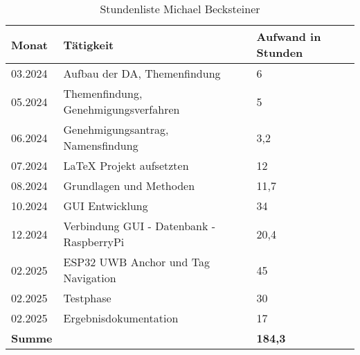 \begin{table}[h]
	\begin{tabular}{p{2.5cm} p{10.5cm} p{2.5cm}}
		\hline
		\textbf{Monat} & \textbf{Tätigkeit} & \textbf{Aufwand in Stunden} \\
		\hline
		03.2024 & Aufbau der DA, Themenfindung & 6 \\
		05.2024 & Themenfindung, Genehmigungsverfahren & 5 \\
		06.2024 & Genehmigungsantrag, Namensfindung & 3,2 \\
		07.2024 & LaTeX Projekt aufsetzten& 12 \\
		08.2024 & Grundlagen und Methoden & 11,7 \\
		10.2024 & GUI Entwicklung & 34 \\
		12.2024 & Verbindung GUI - Datenbank - RaspberryPi & 20,4 \\
		02.2025 & ESP32 UWB Anchor und Tag Navigation & 45 \\
		02.2025 & Testphase & 30 \\
		02.2025 &Ergebnisdokumentation & 17 \\
		
		\hline
		\textbf{Summe} & & \textbf{184,3} \\
		\hline
	\end{tabular}
	\caption{Stundenliste Michael Becksteiner}
	\label{tab:arbeitsaufwand_Becksteiner}
\end{table}


